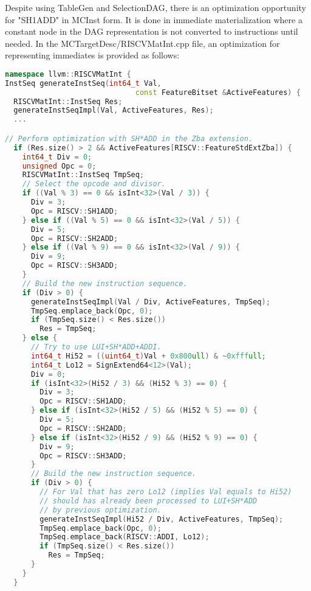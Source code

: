 Despite using TableGen and SelectionDAG, there is an optimization opportunity for "SH1ADD" in MCInst form. It is done in immediate materialization where a constant node in the DAG representation is not converted to instructions until needed. In the MCTargetDesc/RISCVMatInt.cpp file, an optimization for representing immediates is provided as follows:

\begin{lstlisting}[language=C++, caption={Immediate Materialization for "SH1ADD"}]
namespace llvm::RISCVMatInt {
InstSeq generateInstSeq(int64_t Val,
                              const FeatureBitset &ActiveFeatures) {
  RISCVMatInt::InstSeq Res;
  generateInstSeqImpl(Val, ActiveFeatures, Res);
  ...

// Perform optimization with SH*ADD in the Zba extension.
  if (Res.size() > 2 && ActiveFeatures[RISCV::FeatureStdExtZba]) {
    int64_t Div = 0;
    unsigned Opc = 0;
    RISCVMatInt::InstSeq TmpSeq;
    // Select the opcode and divisor.
    if ((Val % 3) == 0 && isInt<32>(Val / 3)) {
      Div = 3;
      Opc = RISCV::SH1ADD;
    } else if ((Val % 5) == 0 && isInt<32>(Val / 5)) {
      Div = 5;
      Opc = RISCV::SH2ADD;
    } else if ((Val % 9) == 0 && isInt<32>(Val / 9)) {
      Div = 9;
      Opc = RISCV::SH3ADD;
    }
    // Build the new instruction sequence.
    if (Div > 0) {
      generateInstSeqImpl(Val / Div, ActiveFeatures, TmpSeq);
      TmpSeq.emplace_back(Opc, 0);
      if (TmpSeq.size() < Res.size())
        Res = TmpSeq;
    } else {
      // Try to use LUI+SH*ADD+ADDI.
      int64_t Hi52 = ((uint64_t)Val + 0x800ull) & ~0xfffull;
      int64_t Lo12 = SignExtend64<12>(Val);
      Div = 0;
      if (isInt<32>(Hi52 / 3) && (Hi52 % 3) == 0) {
        Div = 3;
        Opc = RISCV::SH1ADD;
      } else if (isInt<32>(Hi52 / 5) && (Hi52 % 5) == 0) {
        Div = 5;
        Opc = RISCV::SH2ADD;
      } else if (isInt<32>(Hi52 / 9) && (Hi52 % 9) == 0) {
        Div = 9;
        Opc = RISCV::SH3ADD;
      }
      // Build the new instruction sequence.
      if (Div > 0) {
        // For Val that has zero Lo12 (implies Val equals to Hi52) 
        // should has already been processed to LUI+SH*ADD
        // by previous optimization.
        generateInstSeqImpl(Hi52 / Div, ActiveFeatures, TmpSeq);
        TmpSeq.emplace_back(Opc, 0);
        TmpSeq.emplace_back(RISCV::ADDI, Lo12);
        if (TmpSeq.size() < Res.size())
          Res = TmpSeq;
      }
    }
  }

\end{lstlisting}

